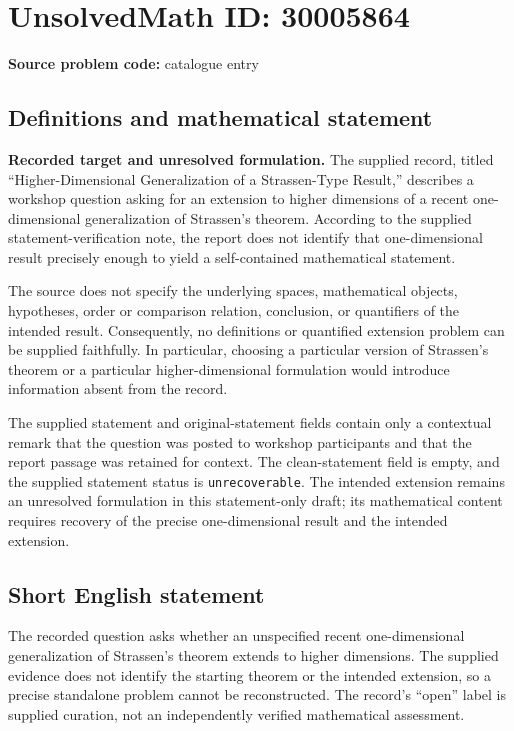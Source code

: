 \documentclass[11pt]{article}
\begin{document}
\section*{UnsolvedMath ID: 30005864}
\textbf{Source problem code:} catalogue entry
\subsection{Definitions and mathematical statement}
\textbf{Recorded target and unresolved formulation.} The supplied record, titled ``Higher-Dimensional Generalization of a Strassen-Type Result,'' describes a workshop question asking for an extension to higher dimensions of a recent one-dimensional generalization of Strassen's theorem. According to the supplied statement-verification note, the report does not identify that one-dimensional result precisely enough to yield a self-contained mathematical statement.

The source does not specify the underlying spaces, mathematical objects, hypotheses, order or comparison relation, conclusion, or quantifiers of the intended result. Consequently, no definitions or quantified extension problem can be supplied faithfully. In particular, choosing a particular version of Strassen's theorem or a particular higher-dimensional formulation would introduce information absent from the record.

The supplied statement and original-statement fields contain only a contextual remark that the question was posted to workshop participants and that the report passage was retained for context. The clean-statement field is empty, and the supplied statement status is \texttt{unrecoverable}. The intended extension remains an unresolved formulation in this statement-only draft; its mathematical content requires recovery of the precise one-dimensional result and the intended extension.
\subsection{Short English statement}
The recorded question asks whether an unspecified recent one-dimensional generalization of Strassen's theorem extends to higher dimensions. The supplied evidence does not identify the starting theorem or the intended extension, so a precise standalone problem cannot be reconstructed. The record's ``open'' label is supplied curation, not an independently verified mathematical assessment.
\end{document}
